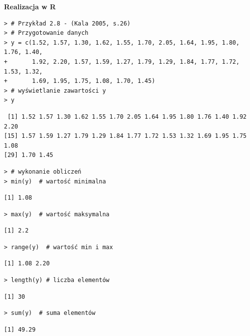 \documentclass[12pt,B5paper,]{book}
\begin{document}
\vspace{0.8cm} \textbf{Realizacja w R}

\begin{verbatim}
> # Przykład 2.8 - (Kala 2005, s.26)
> # Przygotowanie danych
> y = c(1.52, 1.57, 1.30, 1.62, 1.55, 1.70, 2.05, 1.64, 1.95, 1.80, 1.76, 1.40,
+       1.92, 2.20, 1.57, 1.59, 1.27, 1.79, 1.29, 1.84, 1.77, 1.72, 1.53, 1.32,
+       1.69, 1.95, 1.75, 1.08, 1.70, 1.45) 
> # wyświetlanie zawartości y
> y
\end{verbatim}

\begin{verbatim}
 [1] 1.52 1.57 1.30 1.62 1.55 1.70 2.05 1.64 1.95 1.80 1.76 1.40 1.92 2.20
[15] 1.57 1.59 1.27 1.79 1.29 1.84 1.77 1.72 1.53 1.32 1.69 1.95 1.75 1.08
[29] 1.70 1.45
\end{verbatim}

\begin{verbatim}
> # wykonanie obliczeń
> min(y)  # wartość minimalna 
\end{verbatim}

\begin{verbatim}
[1] 1.08
\end{verbatim}

\begin{verbatim}
> max(y)  # wartość maksymalna
\end{verbatim}

\begin{verbatim}
[1] 2.2
\end{verbatim}

\begin{verbatim}
> range(y)  # wartość min i max
\end{verbatim}

\begin{verbatim}
[1] 1.08 2.20
\end{verbatim}

\begin{verbatim}
> length(y) # liczba elementów
\end{verbatim}

\begin{verbatim}
[1] 30
\end{verbatim}

\begin{verbatim}
> sum(y)  # suma elementów 
\end{verbatim}

\begin{verbatim}
[1] 49.29
\end{verbatim}
\end{document}
